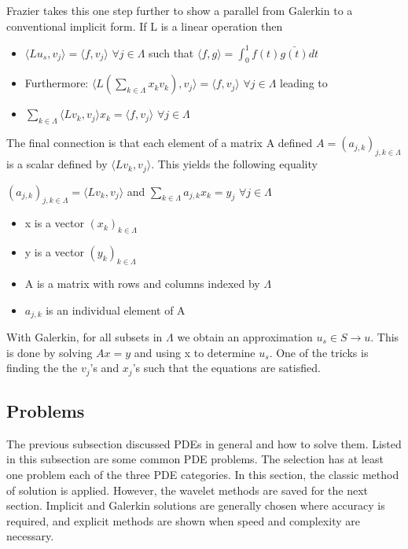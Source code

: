 Frazier takes this one step further to show a parallel from Galerkin to a conventional implicit form.  If L is a linear operation then %
\begin{itemize}
\item $\langle L u_s, v_j \rangle = \langle f, v_j \rangle$ $\forall j\in \Lambda$ such that $\langle f, g \rangle = \int ^1 _0 f(t) \bar{g(t)} dt $ 
\item Furthermore: $\langle L (\sum_{k\in \Lambda} x_k v_k), v_j \rangle = \langle f, v_j \rangle$ $\forall j\in \Lambda$ leading to
\item $\sum_{k\in \Lambda} \langle L v_k , v_j \rangle x_k = \langle f, v_j \rangle$ $\forall j\in \Lambda$ 
\end{itemize}

The final connection is that each element of a matrix A defined $A=(a_{j,k} )_{j,k \in \Lambda}$ is a scalar defined by  $\langle Lv_k , v_j \rangle$.  This yields the following equality

$(a_{j,k} )_{j,k \in \Lambda} = \langle Lv_k , v_j \rangle$ and $\sum_{k\in \Lambda} a_{j,k} x_k = y_j$  $\forall j\in \Lambda$
\begin{itemize}
\item x is a vector $(x_k)_{k\in \Lambda}$
\item y is a vector $(y_k)_{k\in \Lambda}$
\item A is a matrix with rows and columns indexed by $\Lambda$
\item $a_{j,k}$ is an individual element of A

\end{itemize}

With Galerkin, for all subsets in $\Lambda$ we obtain an approximation $u_s \in S \to u$.  This is done by solving $Ax=y$ and using x to determine $u_s$.  One of the tricks is finding the the $v_j$'s and $x_j$'s such that the equations are satisfied.  

\subsection {Problems}
The previous subsection discussed PDEs in general and how to solve them.  Listed in this subsection are some common PDE problems.  The selection has at least one problem each of the three PDE categories.  In this section, the classic method of solution is applied.  However, the wavelet methods are saved for the next section.  Implicit and Galerkin solutions are generally chosen where accuracy is required, and explicit methods are shown when speed and complexity are necessary.  

